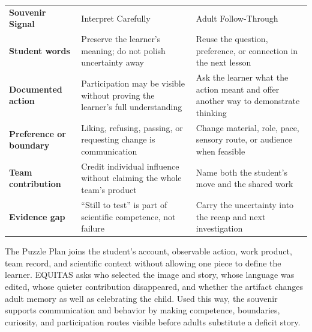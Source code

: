 
\small
\renewcommand{\arraystretch}{1.08}
\setlength{\tabcolsep}{4pt}
\begin{tabularx}{\textwidth}{>{\bfseries\RaggedRight\arraybackslash}p{1.28in} >{\RaggedRight\arraybackslash}p{2.38in} >{\RaggedRight\arraybackslash}X}
\rowcolor{MidTeal}
\color{white}Souvenir Signal & \color{white}Interpret Carefully & \color{white}Adult Follow-Through \\
Student words & Preserve the learner's meaning; do not polish uncertainty away & Reuse the question, preference, or connection in the next lesson \\
\rowcolor{SoftGray}
Documented action & Participation may be visible without proving the learner's full understanding & Ask the learner what the action meant and offer another way to demonstrate thinking \\
Preference or boundary & Liking, refusing, passing, or requesting change is communication & Change material, role, pace, sensory route, or audience when feasible \\
\rowcolor{SoftGray}
Team contribution & Credit individual influence without claiming the whole team's product & Name both the student's move and the shared work \\
Evidence gap & ``Still to test'' is part of scientific competence, not failure & Carry the uncertainty into the recap and next investigation \\
\end{tabularx}
\normalsize


The Puzzle Plan joins the student's account, observable action, work product, team record, and scientific context without allowing one piece to define the learner. EQUITAS asks who selected the image and story, whose language was edited, whose quieter contribution disappeared, and whether the artifact changes adult memory as well as celebrating the child. Used this way, the souvenir supports communication and behavior by making competence, boundaries, curiosity, and participation routes visible before adults substitute a deficit story.



